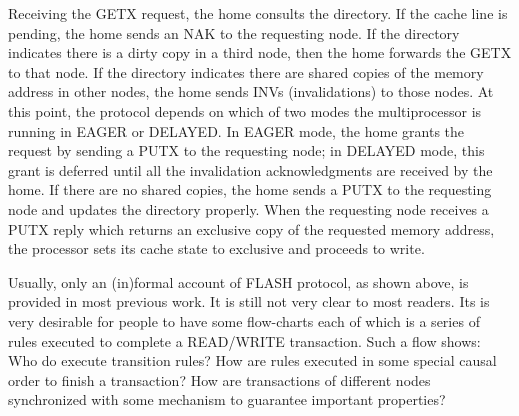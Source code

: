 \documentclass{llncs}
\newcommand{\bedt}[1]{{\color{black}#1}}
\begin{document}
Receiving the GETX request, the home consults the directory. If the \bedt{cache} line is pending,
the home sends an NAK to the requesting node. If the directory indicates there is a dirty
copy in a third node, then the home forwards the GETX to that node. If the directory
indicates there are shared copies of the memory \bedt{address} in other nodes, the home sends
INVs (invalidations) to those nodes. At this point, the protocol depends on which of two
modes the multiprocessor is running in EAGER or DELAYED. In EAGER mode, the home
grants the request by sending a PUTX to the requesting node; in DELAYED mode, this
grant is deferred until all the invalidation acknowledgments are received by the home. If
there are no shared copies, the home sends a PUTX to the requesting node and updates
the directory properly. When the requesting node receives a PUTX reply which returns
an exclusive copy of the requested memory \bedt{address}, the processor sets its cache state to
exclusive and proceeds to write.


Usually, only an \bedt{(in)formal}  account of FLASH protocol, as shown above, is provided in most previous work.   It is still not very clear to most readers. %
Its is very desirable for people to have some flow-charts each of  which is a series of rules executed to complete a READ/WRITE transaction. Such a flow shows: Who do execute transition rules? How  are rules executed in some special causal order to finish a transaction? How are transactions of different nodes  synchronized with some mechanism to guarantee  important properties? %



\end{document}
